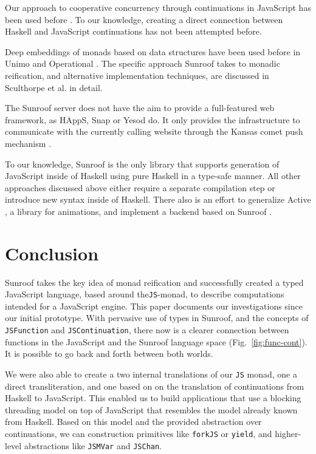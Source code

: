 \documentclass{llncs}
\newcommand{\Src}[1]{{\tt{#1}}}
\newcommand{\JS}{\Src{JS}}
\newcommand{\FigRef}[1]{Fig.~\ref{#1}}
\begin{document}
Our approach to cooperative concurrency through continuations in JavaScript
has been used before 
\cite{Cooper:07:LinksWebProgrammingTiers,Predescu:02:CocoonContinuationBasedControlFlow}.
To our knowledge, creating a direct connection
between Haskell and JavaScript continuations has not been 
attempted before.

Deep embeddings of monads based on data structures have been used before
in Unimo \cite{Lin:06:Unimo} and Operational \cite{Apfelmus:10:Operational,Hackage:10:Operational}.
The specific approach Sunroof takes 
to monadic reification, and alternative implementation techniques,
are discussed in Sculthorpe et al. \cite{Sculthorpe:13:ConstrainedMonads} 
in detail.

The Sunroof server does not have the aim to provide a full-featured 
web framework, as HAppS, Snap or Yesod do. It only provides 
the infrastructure to communicate with the currently calling website
through the Kansas comet \cite{project:kansas-comet} 
push mechanism \cite{pattern:push}. 

To our knowledge, Sunroof is the only library that supports 
generation of JavaScript inside of Haskell using pure Haskell
in a type-safe manner. All other approaches discussed above
either require a separate compilation step or introduce new 
syntax inside of Haskell.
%
There also is an effort to generalize Active \cite{project:active}, a library for animations, and
implement a backend based on Sunroof \cite{project:sunroof-active}.
 
\section{Conclusion}

Sunroof takes the key idea of monad reification and
successfully created a typed JavaScript language, based around the\JS-monad,
to describe computations intended for a JavaScript engine.
This paper documents our investigations since our initial prototype.
With pervasive use of types in Sunroof, and the concepts
of \Src{JSFunction} and \Src{JSContinuation}, there now is a 
clearer connection between
functions in the JavaScript and the Sunroof language space 
(\FigRef{fig:func-cont}). It is possible to go back and forth between 
both worlds. 

We were also able to create a two internal translations of our \JS{} monad,
one a direct transliteration,
and one based on on the translation of continuations from Haskell
to JavaScript. This enabled us to build applications
that use a blocking threading model on top of JavaScript
that resembles the model already known from Haskell.
Based on this model and the provided abstraction over continuations,
we can construction primitives like \Src{forkJS} or \Src{yield},
and higher-level abstractions like \Src{JSMVar} and \Src{JSChan}.
\end{document}
